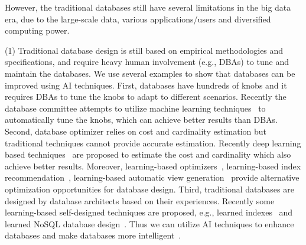 
However, the traditional databases still have several limitations in the big data era, due to the large-scale data, various applications/users and diversified computing power.

(1) Traditional database design is still based on empirical methodologies and specifications, and require heavy human involvement (e.g., DBAs) to tune and maintain the databases. We use several examples to show that databases can be improved using AI techniques. First, databases have hundreds of knobs and it requires DBAs to tune the knobs to adapt to different scenarios. Recently the database committee attempts to utilize machine learning techniques~\cite{DBLP:conf/sigmod/AkenPGZ17, DBLP:conf/vldb/qtune19,  DBLP:conf/sigmod/cdbtune19} to automatically tune the knobs, which can achieve better results than DBAs. Second, database optimizer relies on cost and cardinality estimation but traditional techniques cannot provide accurate estimation. Recently deep learning based techniques~\cite{DBLP:conf/cidr/KipfKRLBK19, DBLP:conf/sigmod/OrtizBGK18} are proposed to estimate the cost and cardinality which also achieve better results. Moreover, learning-based optimizers~\cite{DBLP:journals/corr/abs-1808-03196, DBLP:conf/sigmod/MarcusP18}, learning-based  index recommendation~\cite{DBLP:conf/hais/PedrozoNR18}, learning-based automatic view generation~\cite{DBLP:journals/corr/abs-1903-01363} provide alternative optimization opportunities for database design. Third, traditional databases are designed by database  architects based on their experiences. Recently some learning-based self-designed techniques are proposed, e.g., learned indexes~\cite{DBLP:conf/sigmod/KraskaBCDP18} and learned NoSQL database design~\cite{DBLP:conf/cidr/IdreosDQAHRLJGL19}. Thus we can utilize AI techniques to enhance databases and make databases more intelligent~\cite{DBLP:journals/sigmod/0059Z0JOT16,DBLP:conf/mm/WangCDGOTW15}.      


